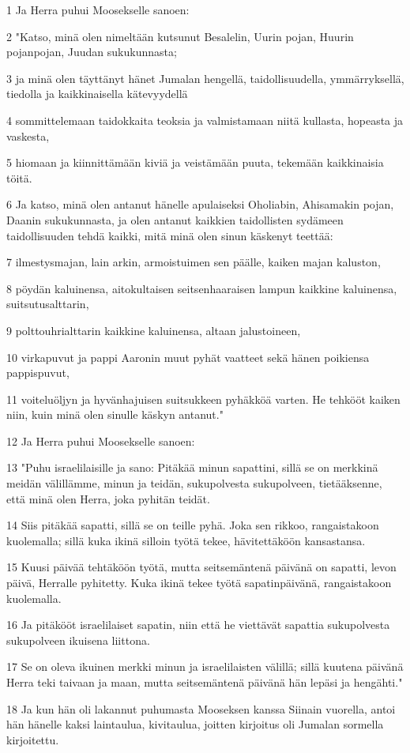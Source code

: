 \par 1 Ja Herra puhui Moosekselle sanoen:
\par 2 "Katso, minä olen nimeltään kutsunut Besalelin, Uurin pojan, Huurin pojanpojan, Juudan sukukunnasta;
\par 3 ja minä olen täyttänyt hänet Jumalan hengellä, taidollisuudella, ymmärryksellä, tiedolla ja kaikkinaisella kätevyydellä
\par 4 sommittelemaan taidokkaita teoksia ja valmistamaan niitä kullasta, hopeasta ja vaskesta,
\par 5 hiomaan ja kiinnittämään kiviä ja veistämään puuta, tekemään kaikkinaisia töitä.
\par 6 Ja katso, minä olen antanut hänelle apulaiseksi Oholiabin, Ahisamakin pojan, Daanin sukukunnasta, ja olen antanut kaikkien taidollisten sydämeen taidollisuuden tehdä kaikki, mitä minä olen sinun käskenyt teettää:
\par 7 ilmestysmajan, lain arkin, armoistuimen sen päälle, kaiken majan kaluston,
\par 8 pöydän kaluinensa, aitokultaisen seitsenhaaraisen lampun kaikkine kaluinensa, suitsutusalttarin,
\par 9 polttouhrialttarin kaikkine kaluinensa, altaan jalustoineen,
\par 10 virkapuvut ja pappi Aaronin muut pyhät vaatteet sekä hänen poikiensa pappispuvut,
\par 11 voiteluöljyn ja hyvänhajuisen suitsukkeen pyhäkköä varten. He tehkööt kaiken niin, kuin minä olen sinulle käskyn antanut."
\par 12 Ja Herra puhui Moosekselle sanoen:
\par 13 "Puhu israelilaisille ja sano: Pitäkää minun sapattini, sillä se on merkkinä meidän välillämme, minun ja teidän, sukupolvesta sukupolveen, tietääksenne, että minä olen Herra, joka pyhitän teidät.
\par 14 Siis pitäkää sapatti, sillä se on teille pyhä. Joka sen rikkoo, rangaistakoon kuolemalla; sillä kuka ikinä silloin työtä tekee, hävitettäköön kansastansa.
\par 15 Kuusi päivää tehtäköön työtä, mutta seitsemäntenä päivänä on sapatti, levon päivä, Herralle pyhitetty. Kuka ikinä tekee työtä sapatinpäivänä, rangaistakoon kuolemalla.
\par 16 Ja pitäkööt israelilaiset sapatin, niin että he viettävät sapattia sukupolvesta sukupolveen ikuisena liittona.
\par 17 Se on oleva ikuinen merkki minun ja israelilaisten välillä; sillä kuutena päivänä Herra teki taivaan ja maan, mutta seitsemäntenä päivänä hän lepäsi ja hengähti."
\par 18 Ja kun hän oli lakannut puhumasta Mooseksen kanssa Siinain vuorella, antoi hän hänelle kaksi laintaulua, kivitaulua, joitten kirjoitus oli Jumalan sormella kirjoitettu.

